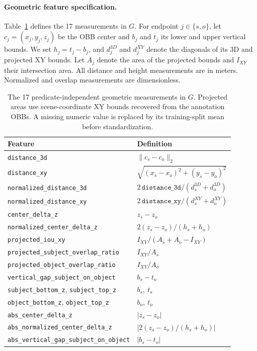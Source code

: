 \paragraph{Geometric feature specification.}
Table~\ref{tab:geometry-features} defines the 17 measurements in \(G\). For endpoint \(j\in\{s,o\}\), let \(c_j=(x_j,y_j,z_j)\) be the OBB center and \(b_j\) and \(t_j\) its lower and upper vertical bounds. We set \(h_j=t_j-b_j\), and \(d_j^{3D}\) and \(d_j^{XY}\) denote the diagonals of its 3D and projected XY bounds.
Let \(A_j\) denote the area of the projected bounds and \(I_{XY}\) their intersection area. All distance and height measurements are in meters. Normalized and overlap measurements are dimensionless.

\begin{table}[t]
\centering
{\small
\setlength{\tabcolsep}{4pt}
\renewcommand{\arraystretch}{1.05}
\begin{tabularx}{\textwidth}{@{}p{}X@{}}
\toprule
Feature & Definition \\
\midrule
\texttt{distance\_3d} &
\(\lVert c_s-c_o\rVert_2\) \\
\texttt{distance\_xy} &
\(\sqrt{(x_s-x_o)^2+(y_s-y_o)^2}\) \\
\texttt{normalized\_distance\_3d} &
\(2\,\texttt{distance\_3d}/(d_s^{3D}+d_o^{3D})\) \\
\texttt{normalized\_distance\_xy} &
\(2\,\texttt{distance\_xy}/(d_s^{XY}+d_o^{XY})\) \\
\texttt{center\_delta\_z} &
\(z_s-z_o\) \\
\texttt{normalized\_center\_delta\_z} &
\(2(z_s-z_o)/(h_s+h_o)\) \\
\texttt{projected\_iou\_xy} &
\(I_{XY}/(A_s+A_o-I_{XY})\) \\
\texttt{projected\_subject\_overlap\_ratio} &
\(I_{XY}/A_s\) \\
\texttt{projected\_object\_overlap\_ratio} &
\(I_{XY}/A_o\) \\
\texttt{vertical\_gap\_subject\_on\_object} &
\(b_s-t_o\) \\
\texttt{subject\_bottom\_z}, \texttt{subject\_top\_z} &
\(b_s,\ t_s\) \\
\texttt{object\_bottom\_z}, \texttt{object\_top\_z} &
\(b_o,\ t_o\) \\
\texttt{abs\_center\_delta\_z} &
\(\lvert z_s-z_o\rvert\) \\
\texttt{abs\_normalized\_center\_delta\_z} &
\(\lvert2(z_s-z_o)/(h_s+h_o)\rvert\) \\
\texttt{abs\_vertical\_gap\_subject\_on\_object} &
\(\lvert b_s-t_o\rvert\) \\
\bottomrule
\end{tabularx}
}
\caption{The 17 predicate-independent geometric measurements in \(G\). Projected areas use scene-coordinate XY bounds recovered from the annotation OBBs. A missing numeric value is replaced by its training-split mean before standardization.}
\label{tab:geometry-features}
\end{table}


